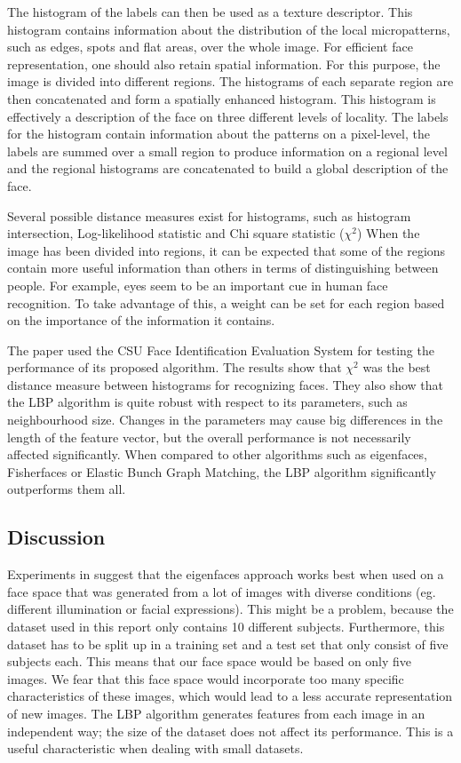 \documentclass[]{article}
\begin{document}
The histogram of the labels can then be used as a texture descriptor. This histogram contains information about the distribution of the local micropatterns, such as edges, spots and flat areas, over the whole image. For efficient face representation, one should also retain spatial information. For this purpose, the image is divided into different regions. The histograms of each separate region are then concatenated and form a spatially enhanced histogram. This histogram is effectively a description of the face on three different levels of locality. The labels for the histogram contain information about the patterns on a pixel-level, the labels are summed over a small region to produce information on a regional level and the regional histograms are concatenated to build a global description of the face.

Several possible distance measures exist for histograms, such as histogram intersection, Log-likelihood statistic and Chi square statistic ($\chi^2$) When the image has been divided into regions, it can be expected that some of the regions contain more useful information than others in terms of distinguishing between people. For example, eyes seem to be an important cue in human face recognition. To take advantage of this, a weight can be set for each region based on the importance of the information it contains. 

The paper used the CSU Face Identification Evaluation System for testing the performance of its proposed algorithm. The results show that $\chi^2$ was the best distance measure between histograms for recognizing faces. They also show that the LBP algorithm is quite robust with respect to its parameters, such as neighbourhood size. Changes in the parameters may cause big differences in the length of the feature vector, but the overall performance is not necessarily affected significantly. When compared to other algorithms such as eigenfaces, Fisherfaces or Elastic Bunch Graph Matching, the LBP algorithm significantly outperforms them all.
\clearpage
\subsection{Discussion}
Experiments in \cite{chang2005evaluation} suggest that the eigenfaces approach works best when used on a face space that was generated from a lot of images with diverse conditions (eg. different illumination or facial expressions). This might be a problem, because the dataset used in this report only contains 10 different subjects. Furthermore, this dataset has to be split up in a training set and a test set that only consist of five subjects each. This means that our face space would be based on only five images. We fear that this face space would incorporate too many specific characteristics of these images, which would lead to a less accurate representation of new images. The LBP algorithm generates features from each image in an independent way; the size of the dataset does not affect its performance. This is a useful characteristic when dealing with small datasets.
\end{document}
